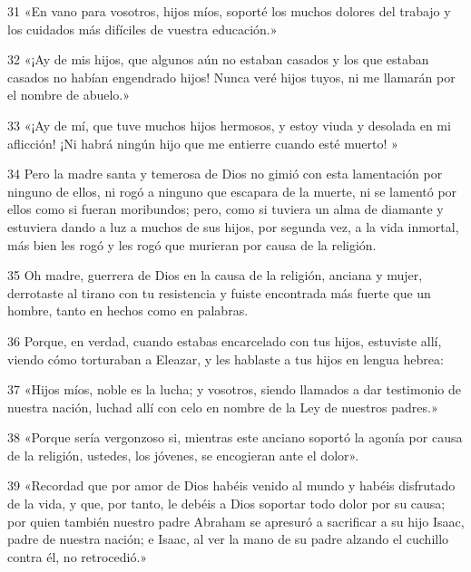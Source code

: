 \par 31 «En vano para vosotros, hijos míos, soporté los muchos dolores del trabajo y los cuidados más difíciles de vuestra educación.»

\par 32 «¡Ay de mis hijos, que algunos aún no estaban casados ​​y los que estaban casados ​​no habían engendrado hijos! Nunca veré hijos tuyos, ni me llamarán por el nombre de abuelo.»

\par 33 «¡Ay de mí, que tuve muchos hijos hermosos, y estoy viuda y desolada en mi aflicción! ¡Ni habrá ningún hijo que me entierre cuando esté muerto! »

\par 34 Pero la madre santa y temerosa de Dios no gimió con esta lamentación por ninguno de ellos, ni rogó a ninguno que escapara de la muerte, ni se lamentó por ellos como si fueran moribundos; pero, como si tuviera un alma de diamante y estuviera dando a luz a muchos de sus hijos, por segunda vez, a la vida inmortal, más bien les rogó y les rogó que murieran por causa de la religión.

\par 35 Oh madre, guerrera de Dios en la causa de la religión, anciana y mujer, derrotaste al tirano con tu resistencia y fuiste encontrada más fuerte que un hombre, tanto en hechos como en palabras.

\par 36 Porque, en verdad, cuando estabas encarcelado con tus hijos, estuviste allí, viendo cómo torturaban a Eleazar, y les hablaste a tus hijos en lengua hebrea:

\par 37 «Hijos míos, noble es la lucha; y vosotros, siendo llamados a dar testimonio de nuestra nación, luchad allí con celo en nombre de la Ley de nuestros padres.»

\par 38 «Porque sería vergonzoso si, mientras este anciano soportó la agonía por causa de la religión, ustedes, los jóvenes, se encogieran ante el dolor».

\par 39 «Recordad que por amor de Dios habéis venido al mundo y habéis disfrutado de la vida, y que, por tanto, le debéis a Dios soportar todo dolor por su causa; por quien también nuestro padre Abraham se apresuró a sacrificar a su hijo Isaac, padre de nuestra nación; e Isaac, al ver la mano de su padre alzando el cuchillo contra él, no retrocedió.»

